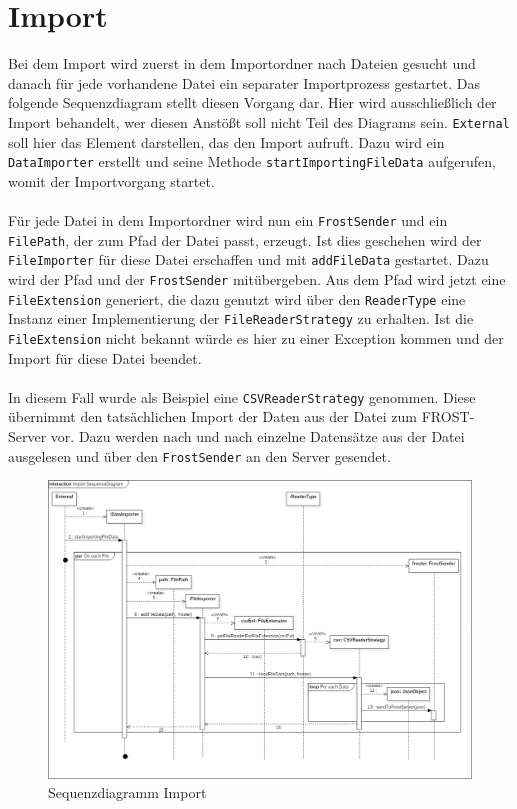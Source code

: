 \section{Import}
Bei dem Import wird zuerst in dem Importordner nach Dateien gesucht und danach für jede vorhandene Datei ein separater Importprozess gestartet. Das folgende Sequenzdiagram stellt diesen Vorgang dar. Hier wird ausschließlich der Import behandelt, wer diesen Anstößt soll nicht Teil des Diagrams sein. \texttt{External} soll hier das Element darstellen, das den Import aufruft. Dazu wird ein \texttt{DataImporter} erstellt und seine Methode \texttt{startImportingFileData} aufgerufen, womit der Importvorgang startet.\\\\
Für jede Datei in dem Importordner wird nun ein \texttt{FrostSender} und ein \texttt{FilePath}, der zum Pfad der Datei passt, erzeugt. Ist dies geschehen wird der \texttt{FileImporter} für diese Datei erschaffen und mit \texttt{addFileData} gestartet. Dazu wird der Pfad und der \texttt{FrostSender} mitübergeben. Aus dem Pfad wird jetzt eine \texttt{FileExtension} generiert, die dazu genutzt wird über den \texttt{ReaderType} eine Instanz einer Implementierung der \texttt{FileReaderStrategy} zu erhalten. Ist die \texttt{FileExtension} nicht bekannt würde es hier zu einer Exception kommen und der Import für diese Datei beendet.\\\\
In diesem Fall wurde als Beispiel eine \texttt{CSVReaderStrategy} genommen. Diese übernimmt den tatsächlichen Import der Daten aus der Datei zum FROST-Server vor. Dazu werden nach und nach einzelne Datensätze aus der Datei ausgelesen und über den \texttt{FrostSender} an den Server gesendet.
\begin{figure}[!hbp]
	\centering
	\includegraphics[width=0.9\linewidth]{images/import/ImportSequenceDiagram.png}
	\caption{Sequenzdiagramm Import}
\end{figure}
\newpage

